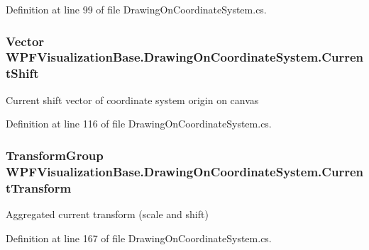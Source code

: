 Definition at line 99 of file Drawing\+On\+Coordinate\+System.\+cs.

\subsubsection[{\texorpdfstring{Current\+Shift}{CurrentShift}}]{\setlength{\rightskip}{0pt plus 5cm}Vector W\+P\+F\+Visualization\+Base.\+Drawing\+On\+Coordinate\+System.\+Current\+Shift\hspace{0.3cm}{\ttfamily [get]}}\hypertarget{class_w_p_f_visualization_base_1_1_drawing_on_coordinate_system_ae70f7257a119ae1c6b01f547cabecae4}{}\label{class_w_p_f_visualization_base_1_1_drawing_on_coordinate_system_ae70f7257a119ae1c6b01f547cabecae4}


Current shift vector of coordinate system origin on canvas 



Definition at line 116 of file Drawing\+On\+Coordinate\+System.\+cs.

\subsubsection[{\texorpdfstring{Current\+Transform}{CurrentTransform}}]{\setlength{\rightskip}{0pt plus 5cm}Transform\+Group W\+P\+F\+Visualization\+Base.\+Drawing\+On\+Coordinate\+System.\+Current\+Transform\hspace{0.3cm}{\ttfamily [get]}}\hypertarget{class_w_p_f_visualization_base_1_1_drawing_on_coordinate_system_a42adb02df11d5d052de3223a4d951343}{}\label{class_w_p_f_visualization_base_1_1_drawing_on_coordinate_system_a42adb02df11d5d052de3223a4d951343}


Aggregated current transform (scale and shift) 



Definition at line 167 of file Drawing\+On\+Coordinate\+System.\+cs.

